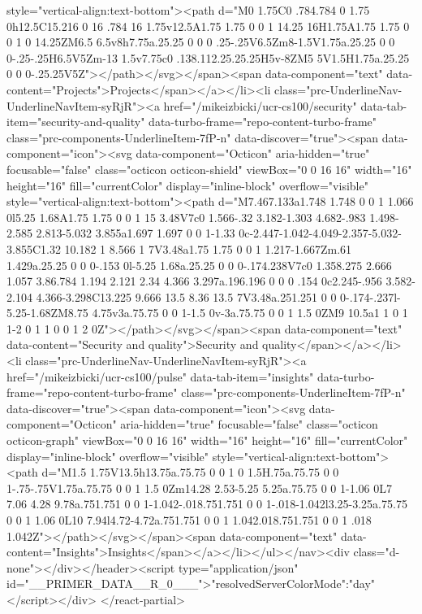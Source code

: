 style="vertical-align:text-bottom"><path d="M0 1.75C0 .784.784 0 1.75 0h12.5C15.216 0 16 .784 16 1.75v12.5A1.75 1.75 0 0 1 14.25 16H1.75A1.75 1.75 0 0 1 0 14.25ZM6.5 6.5v8h7.75a.25.25 0 0 0 .25-.25V6.5Zm8-1.5V1.75a.25.25 0 0 0-.25-.25H6.5V5Zm-13 1.5v7.75c0 .138.112.25.25.25H5v-8ZM5 5V1.5H1.75a.25.25 0 0 0-.25.25V5Z"></path></svg></span><span data-component="text" data-content="Projects">Projects</span></a></li><li class="prc-UnderlineNav-UnderlineNavItem-syRjR"><a href="/mikeizbicki/ucr-cs100/security" data-tab-item="security-and-quality" data-turbo-frame="repo-content-turbo-frame" class="prc-components-UnderlineItem-7fP-n" data-discover="true"><span data-component="icon"><svg data-component="Octicon" aria-hidden="true" focusable="false" class="octicon octicon-shield" viewBox="0 0 16 16" width="16" height="16" fill="currentColor" display="inline-block" overflow="visible" style="vertical-align:text-bottom"><path d="M7.467.133a1.748 1.748 0 0 1 1.066 0l5.25 1.68A1.75 1.75 0 0 1 15 3.48V7c0 1.566-.32 3.182-1.303 4.682-.983 1.498-2.585 2.813-5.032 3.855a1.697 1.697 0 0 1-1.33 0c-2.447-1.042-4.049-2.357-5.032-3.855C1.32 10.182 1 8.566 1 7V3.48a1.75 1.75 0 0 1 1.217-1.667Zm.61 1.429a.25.25 0 0 0-.153 0l-5.25 1.68a.25.25 0 0 0-.174.238V7c0 1.358.275 2.666 1.057 3.86.784 1.194 2.121 2.34 4.366 3.297a.196.196 0 0 0 .154 0c2.245-.956 3.582-2.104 4.366-3.298C13.225 9.666 13.5 8.36 13.5 7V3.48a.251.251 0 0 0-.174-.237l-5.25-1.68ZM8.75 4.75v3a.75.75 0 0 1-1.5 0v-3a.75.75 0 0 1 1.5 0ZM9 10.5a1 1 0 1 1-2 0 1 1 0 0 1 2 0Z"></path></svg></span><span data-component="text" data-content="Security and quality">Security and quality</span></a></li><li class="prc-UnderlineNav-UnderlineNavItem-syRjR"><a href="/mikeizbicki/ucr-cs100/pulse" data-tab-item="insights" data-turbo-frame="repo-content-turbo-frame" class="prc-components-UnderlineItem-7fP-n" data-discover="true"><span data-component="icon"><svg data-component="Octicon" aria-hidden="true" focusable="false" class="octicon octicon-graph" viewBox="0 0 16 16" width="16" height="16" fill="currentColor" display="inline-block" overflow="visible" style="vertical-align:text-bottom"><path d="M1.5 1.75V13.5h13.75a.75.75 0 0 1 0 1.5H.75a.75.75 0 0 1-.75-.75V1.75a.75.75 0 0 1 1.5 0Zm14.28 2.53-5.25 5.25a.75.75 0 0 1-1.06 0L7 7.06 4.28 9.78a.751.751 0 0 1-1.042-.018.751.751 0 0 1-.018-1.042l3.25-3.25a.75.75 0 0 1 1.06 0L10 7.94l4.72-4.72a.751.751 0 0 1 1.042.018.751.751 0 0 1 .018 1.042Z"></path></svg></span><span data-component="text" data-content="Insights">Insights</span></a></li></ul></nav><div class="d-none"></div></header><script type="application/json" id="__PRIMER_DATA__R_0___">{"resolvedServerColorMode":"day"}</script></div>
</react-partial>


